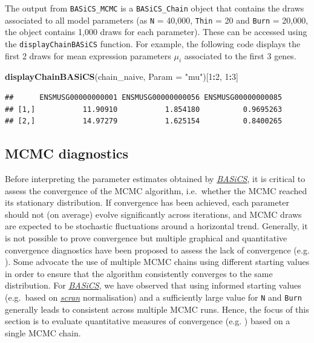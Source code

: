 \documentclass[9pt,a4paper,]{extarticle}
\newenvironment{Shaded}{\begin{snugshade}}{\end{snugshade}}
\newcommand{\DataTypeTok}[1]{\textcolor[rgb]{0.13,0.29,0.53}{#1}}
\newcommand{\DecValTok}[1]{\textcolor[rgb]{0.00,0.00,0.81}{#1}}
\newcommand{\KeywordTok}[1]{\textcolor[rgb]{0.13,0.29,0.53}{\textbf{#1}}}
\newcommand{\NormalTok}[1]{#1}
\newcommand{\OperatorTok}[1]{\textcolor[rgb]{0.81,0.36,0.00}{\textbf{#1}}}
\newcommand{\StringTok}[1]{\textcolor[rgb]{0.31,0.60,0.02}{#1}}
\begin{document}
The output from \texttt{BASiCS\_MCMC} is a \texttt{BASiCS\_Chain} object that contains the
draws associated to all model parameters (as \texttt{N} = 40,000, \texttt{Thin} = 20 and
\texttt{Burn} = 20,000, the object contains 1,000 draws for each parameter).
These can be accessed using the \texttt{displayChainBASiCS} function.
For example, the following code displays the first 2 draws for mean
expression parameters \(\mu_i\) associated to the first 3 genes.

\begin{Shaded}
\begin{Highlighting}[]
\KeywordTok{displayChainBASiCS}\NormalTok{(chain_naive, }\DataTypeTok{Param =} \StringTok{"mu"}\NormalTok{)[}\DecValTok{1}\OperatorTok{:}\DecValTok{2}\NormalTok{, }\DecValTok{1}\OperatorTok{:}\DecValTok{3}\NormalTok{]}
\end{Highlighting}
\end{Shaded}

\begin{verbatim}
##      ENSMUSG00000000001 ENSMUSG00000000056 ENSMUSG00000000085
## [1,]           11.90910           1.854180          0.9695263
## [2,]           14.97279           1.625154          0.8400265
\end{verbatim}

\hypertarget{mcmc-diagnostics}{%
\subsection{MCMC diagnostics}\label{mcmc-diagnostics}}

Before interpreting the parameter estimates obtained by \emph{\href{https://bioconductor.org/packages/3.11/BASiCS}{BASiCS}},
it is critical to assess the convergence of the MCMC algorithm, i.e.~whether
the MCMC reached its stationary distribution.
If convergence has been achieved, each parameter should not (on average) evolve
significantly across iterations, and MCMC draws are expected to be stochastic
fluctuations around a horizontal trend.
Generally, it is not possible to prove convergence but multiple graphical and
quantitative convergence diagnostics have been proposed to assess the lack
of convergence (e.g. \citep{CowlesCarlin1996, BrooksGelman1998}).
Some advocate the use of multiple MCMC chains using different starting values in
order to ensure that the algorithm consistently converges to the same
distribution.
For \emph{\href{https://bioconductor.org/packages/3.11/BASiCS}{BASiCS}}, we have observed that using informed starting values
(e.g.~based on \emph{\href{https://bioconductor.org/packages/3.11/scran}{scran}} normalisation) and a sufficiently large
value for \texttt{N} and \texttt{Burn} generally leads to consistent across multiple MCMC runs.
Hence, the focus of this section is to evaluate quantitative measures of
convergence (e.g. \citep{Geweke1995}) based on a single MCMC chain.
\end{document}
